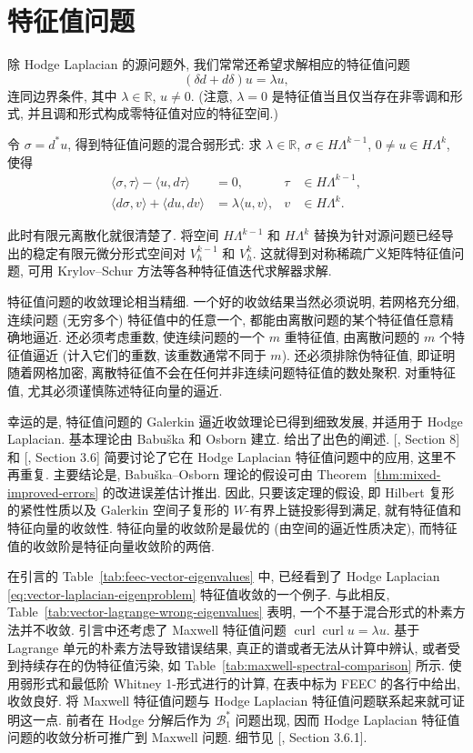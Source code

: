 \section{特征值问题}\label{sec:eigenvalue-problems}

除 Hodge Laplacian 的源问题外, 我们常常还希望求解相应的特征值问题
\[
(\delta d+d\delta)u=\lambda u,
\]
连同边界条件, 其中 $\lambda\in\mathbb R$, $u\neq0$. (注意, $\lambda=0$ 是特征值当且仅当存在非零调和形式, 并且调和形式构成零特征值对应的特征空间.)

令 $\sigma=d^*u$, 得到特征值问题的混合弱形式: 求 $\lambda\in\mathbb R$, $\sigma\in H\Lambda^{k-1}$, $0\neq u\in H\Lambda^k$, 使得
\[
\begin{aligned}
\langle\sigma,\tau\rangle-\langle u,d\tau\rangle&=0,&\tau&\in H\Lambda^{k-1},\\
\langle d\sigma,v\rangle+\langle du,dv\rangle&=\lambda\langle u,v\rangle,&v&\in H\Lambda^k.
\end{aligned}
\]

此时有限元离散化就很清楚了. 将空间 $H\Lambda^{k-1}$ 和 $H\Lambda^k$ 替换为针对源问题已经导出的稳定有限元微分形式空间对 $V_h^{k-1}$ 和 $V_h^k$. 这就得到对称稀疏广义矩阵特征值问题, 可用 Krylov–Schur 方法等各种特征值迭代求解器求解.

特征值问题的收敛理论相当精细. 一个好的收敛结果当然必须说明, 若网格充分细, 连续问题 (无穷多个) 特征值中的任意一个, 都能由离散问题的某个特征值任意精确地逼近. 还必须考虑重数, 使连续问题的一个 $m$ 重特征值, 由离散问题的 $m$ 个特征值逼近 (计入它们的重数, 该重数通常不同于 $m$). 还必须排除伪特征值, 即证明随着网格加密, 离散特征值不会在任何并非连续问题特征值的数处聚积. 对重特征值, 尤其必须谨慎陈述特征向量的逼近.

幸运的是, 特征值问题的 Galerkin 逼近收敛理论已得到细致发展, 并适用于 Hodge Laplacian. 基本理论由 Babuška 和 Osborn  建立.  给出了出色的阐述. [, Section 8] 和 [, Section 3.6] 简要讨论了它在 Hodge Laplacian 特征值问题中的应用, 这里不再重复. 主要结论是, Babuška–Osborn 理论的假设可由 Theorem~\ref{thm:mixed-improved-errors} 的改进误差估计推出. 因此, 只要该定理的假设, 即 Hilbert 复形的紧性性质以及 Galerkin 空间子复形的 $W$-有界上链投影得到满足, 就有特征值和特征向量的收敛性. 特征向量的收敛阶是最优的 (由空间的逼近性质决定), 而特征值的收敛阶是特征向量收敛阶的两倍.

在引言的 Table~\ref{tab:feec-vector-eigenvalues} 中, 已经看到了 Hodge Laplacian \eqref{eq:vector-laplacian-eigenproblem} 特征值收敛的一个例子. 与此相反, Table~\ref{tab:vector-lagrange-wrong-eigenvalues} 表明, 一个不基于混合形式的朴素方法并不收敛. 引言中还考虑了 Maxwell 特征值问题 $\operatorname{curl}\operatorname{curl}u=\lambda u$. 基于 Lagrange 单元的朴素方法导致错误结果, 真正的谱或者无法从计算中辨认, 或者受到持续存在的伪特征值污染, 如 Table~\ref{tab:maxwell-spectral-comparison} 所示. 使用弱形式和最低阶 Whitney 1-形式进行的计算, 在表中标为 FEEC 的各行中给出, 收敛良好. 将 Maxwell 特征值问题与 Hodge Laplacian 特征值问题联系起来就可证明这一点. 前者在 Hodge 分解后作为 $\mathcal B_1^*$ 问题出现, 因而 Hodge Laplacian 特征值问题的收敛分析可推广到 Maxwell 问题. 细节见 [, Section 3.6.1].
